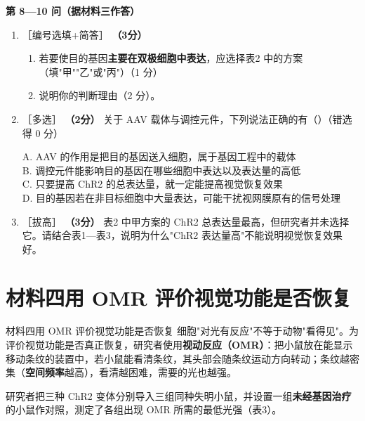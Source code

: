 \documentclass[UTF8,a4paper,11pt]{ctexart}
\newcommand{\pt}[1]{\textbf{（#1分）}}
\newcommand{\lv}[1]{{\small\color{deepgreen}［#1］}}
\newcommand{\tian}[1]{\underline{\hspace{#1}}}
\newcommand{\choice}[1]{\par\smallskip\noindent #1\par}
\begin{document}
\begin{qbox}
\noindent\textbf{\color{deepgreen}第 8—10 问（据材料三作答）}
\begin{enumerate}[leftmargin=2.2em,itemsep=5pt,start=8]
\item \lv{编号选填+简答} \pt{3}
\begin{enumerate}[label=(\arabic*),leftmargin=1.4em,itemsep=2pt]
\item 若要使目的基因\textbf{主要在双极细胞中表达}，应选择表2 中的方案\tian{0.8cm}（填"甲""乙"或"丙"）（1 分）
\item 说明你的判断理由（2 分）。
\end{enumerate}

\item \lv{多选} \pt{2} 关于 AAV 载体与调控元件，下列说法正确的有（\quad）（错选得 0 分）\\
\choice{A. AAV 的作用是把目的基因送入细胞，属于基因工程中的载体\\
B. 调控元件能影响目的基因在哪些细胞中表达以及表达量的高低\\
C. 只要提高 ChR2 的总表达量，就一定能提高视觉恢复效果\\
D. 目的基因若在非目标细胞中大量表达，可能干扰视网膜原有的信号处理}

\item \lv{拔高} \pt{3} 表2 中甲方案的 ChR2 总表达量最高，但研究者并未选择它。请结合表1—表3，说明为什么"ChR2 表达量高"不能说明视觉恢复效果好。
\end{enumerate}
\end{qbox}

\section{材料四\quad 用 OMR 评价视觉功能是否恢复}

\begin{matbox}{材料四\quad 用 OMR 评价视觉功能是否恢复}
细胞"对光有反应"不等于动物"看得见"。为评价视觉功能是否真正恢复，研究者使用\textbf{视动反应（OMR）}：把小鼠放在能显示移动条纹的装置中，若小鼠能看清条纹，其头部会随条纹运动方向转动；条纹越密集（\textbf{空间频率}越高），看清越困难，需要的光也越强。

研究者把三种 ChR2 变体分别导入三组同种失明小鼠，并设置一组\textbf{未经基因治疗}的小鼠作对照，测定了各组出现 OMR 所需的最低光强（表3）。
\end{matbox}
\end{document}
